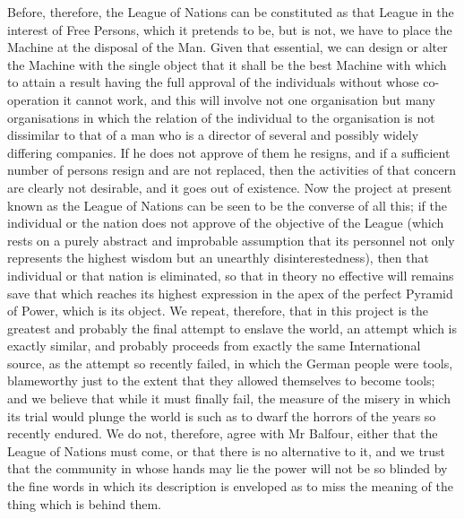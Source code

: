 \documentclass{book}
\begin{document}
Before, therefore, the League of Nations can be constituted as that League in the interest of Free Persons, which it pretends to be, but is not, we have to place the Machine at the disposal of the Man. Given that essential, we can design or alter the Machine with the single object that it shall be the best Machine with which to attain a result having the full approval of the individuals without whose co-operation it cannot work, and this will involve not one organisation but many organisations in which the relation of the individual to the organisation is not dissimilar to that of a man who is a director of several and possibly widely differing companies. If he does not approve of them he resigns, and if a sufficient number of persons resign and are not replaced, then the activities of that concern are clearly not desirable, and it goes out of existence. Now the project at present known as the League of Nations can be seen to be the converse of all this; if the individual or the nation does not approve of the objective of the League (which rests on a purely abstract and improbable assumption that its personnel not only represents the highest wisdom but an unearthly disinterestedness), then that individual or that nation is eliminated, so that in theory no effective will remains save that which reaches its highest expression in the apex of the perfect Pyramid of Power, which is its object. We repeat, therefore, that in this project is the greatest and probably the final attempt to enslave the world, an attempt which is exactly similar, and probably proceeds from exactly the same International source, as the attempt so recently failed, in which the German people were tools, blameworthy just to the extent that they allowed themselves to become tools; and we believe that while it must finally fail, the measure of the misery in which its trial would plunge the world is such as to dwarf the horrors of the years so recently endured. We do not, therefore, agree with Mr Balfour, either that the League of Nations must come, or that there is no alternative to it, and we trust that the community in whose hands may lie the power will not be so blinded by the fine words in which its description is enveloped as to miss the meaning of the thing which is behind them.
\end{document}
